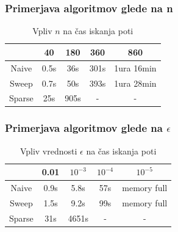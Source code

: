 \documentclass{beamer}
\begin{document}
\begin{frame}
    \frametitle{Primerjava algoritmov glede na n}
    \begin{table}[h]
        \centering
        \begin{tabular}{|c|c|c|c|c|}
            \hline
             & 40 & 180 & 360 & 860 \\
            \hline
            Naive & 0.5s & 36s & 301s & 1ura 16min \\
            \hline
            Sweep & 0.7s & 50s & 393s & 1ura 28min \\
            \hline
            Sparse & 25s & 905s & - & - \\
            \hline
        \end{tabular}
        \caption{Vpliv $n$ na čas iskanja poti}
    \end{table}
\end{frame}

\begin{frame}
    \frametitle{Primerjava algoritmov glede na $\epsilon$}
    \begin{table}[h]
        \centering
        \begin{tabular}{|c|c|c|c|c|}
            \hline
             & 0.01 & $10^{-3}$ & $10^{-4}$ & $10^{-5}$ \\
            \hline
            Naive & 0.9s & 5.8s & 57s & memory full \\
            \hline
            Sweep & 1.5s & 9.2s & 99s & memory full \\
            \hline
            Sparse & 31s & 4651s & - & - \\
            \hline
        \end{tabular}
        \caption{Vpliv vrednosti $\epsilon$ na čas iskanja poti}
    \end{table}
\end{frame}
\end{document}
